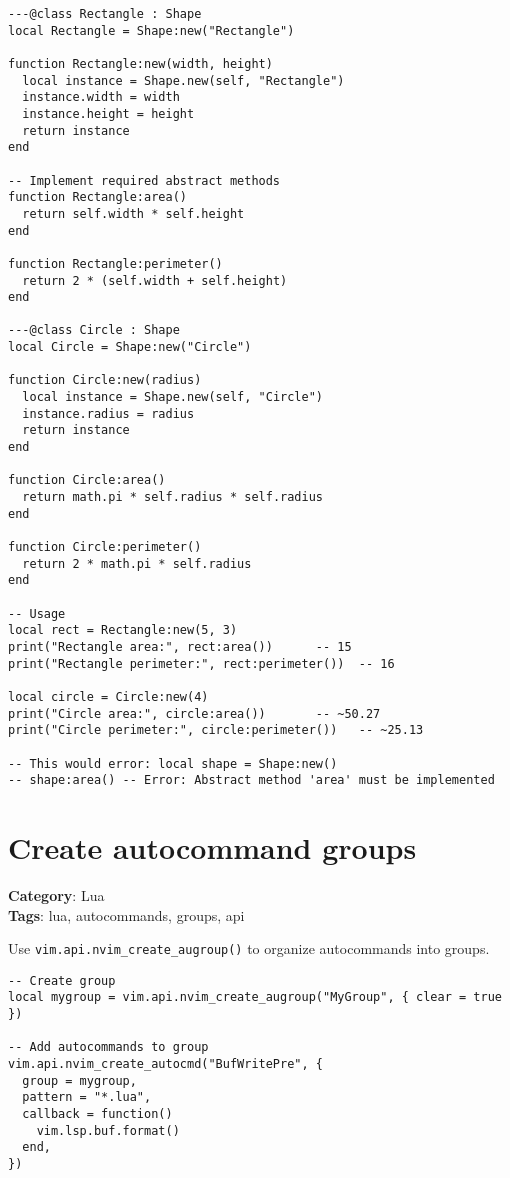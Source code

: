 {{{{{{\begin{Exa*}{}
\begin{Verbatim}[fontsize=\footnotesize, breaklines, breakanywhere]
---@class Rectangle : Shape
local Rectangle = Shape:new("Rectangle")

function Rectangle:new(width, height)
  local instance = Shape.new(self, "Rectangle")
  instance.width = width
  instance.height = height
  return instance
end

-- Implement required abstract methods
function Rectangle:area()
  return self.width * self.height
end

function Rectangle:perimeter()
  return 2 * (self.width + self.height)
end

---@class Circle : Shape
local Circle = Shape:new("Circle")

function Circle:new(radius)
  local instance = Shape.new(self, "Circle")
  instance.radius = radius
  return instance
end

function Circle:area()
  return math.pi * self.radius * self.radius
end

function Circle:perimeter()
  return 2 * math.pi * self.radius
end

-- Usage
local rect = Rectangle:new(5, 3)
print("Rectangle area:", rect:area())      -- 15
print("Rectangle perimeter:", rect:perimeter())  -- 16

local circle = Circle:new(4)
print("Circle area:", circle:area())       -- ~50.27
print("Circle perimeter:", circle:perimeter())   -- ~25.13

-- This would error: local shape = Shape:new()
-- shape:area() -- Error: Abstract method 'area' must be implemented
\end{Verbatim}
\end{Exa*}

\section{Create autocommand groups}

\textbf{Category}: Lua\\ \textbf{Tags}: lua, autocommands, groups, api
\vspace{0.5cm}

Use {\footnotesize \Verb§vim.api.nvim_create_augroup()§} to organize autocommands into groups.

\begin{Exa*}{}
\begin{Verbatim}[fontsize=\footnotesize, breaklines, breakanywhere]
-- Create group
local mygroup = vim.api.nvim_create_augroup("MyGroup", { clear = true })

-- Add autocommands to group
vim.api.nvim_create_autocmd("BufWritePre", {
  group = mygroup,
  pattern = "*.lua",
  callback = function()
    vim.lsp.buf.format()
  end,
})
\end{Verbatim}
\end{Exa*}

}}}}}}

